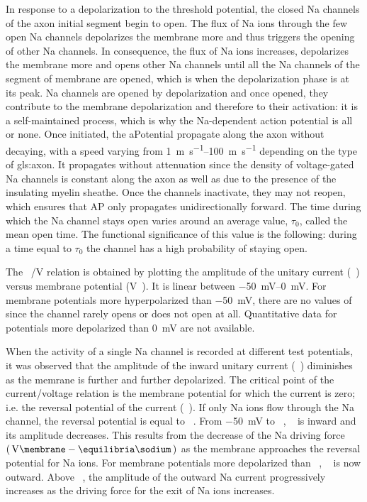 \documentclass[../../Orator]{subfiles}
\begin{document}
In response to a depolarization to the threshold potential, the closed \gls{Na} channels of the axon initial segment begin to open. The flux of \gls{Na} ions through the few open \gls{Na} channels depolarizes the membrane more and thus triggers the opening of other \gls{Na} channels. In consequence, the flux of \gls{Na} ions increases, depolarizes the membrane more and opens other \gls{Na} channels until all the \gls{Na} channels of the segment of membrane are opened, which is when the depolarization phase is at its peak. \gls{Na} channels are opened by depolarization and once opened, they contribute to the membrane depolarization and therefore to their activation: it is a self-maintained process, which is why the  \gls{Na}-dependent  action  potential  is  all  or  none. Once initiated, the \gls{aPotential} propagate along the axon without decaying, with a speed varying from \qtyrange{1}{100}{\m\per\s} depending on the type of \gls{gls:axon}.  It  propagates  without  attenuation  since  the  density of voltage-gated \gls{Na} channels is constant along the  axon as well as due to the presence of the insulating myelin sheathe.  Once the channels inactivate, they may not reopen, which ensures that AP only propagates  unidirectionally forward. 
The time during which the \gls{Na} channel stays open varies around an average value, \(\tau_0\), called the mean open time. The functional significance of this value is the following: during a time equal to \(\tau_0\) the channel has a high probability of staying open. 

The \unit[per-mode = symbol]{\cur\sodium\per\V} relation is obtained by plotting the amplitude of the unitary current (\unit{\cur\sodium}) versus membrane potential (\unit{\V\membrane}). It is linear between \qtyrange{-50}{0}{\mV}. For membrane potentials more hyperpolarized than \qty{-50}{\mV}, there are no values of \unit{\cur\sodium} since the channel rarely opens or does not open at all. Quantitative data for potentials more depolarized than \qty{0}{\mV} are not available.

When the activity of a single \gls{Na} channel is  recorded at different test potentials, it was observed that the amplitude of the inward unitary current (\unit{\cur\sodium}) diminishes as the memrane is further and further depolarized. The critical point of the current/voltage relation is the membrane potential for which the current is zero; i.e. the reversal potential of the current (\unit{\equilibria\reverse}). If only \gls{Na} ions flow through the \gls{Na} channel, the reversal potential is equal to \unit{\equilibria\sodium}. From \qty{-50}{\mV} to \unit{\equilibria\reverse}, \unit{\cur\sodium} is inward and its amplitude decreases. This results from the decrease of the \gls{Na} driving force \(\br{\unit{\V\membrane}-\unit{\equilibria\sodium}}\) as the membrane approaches the reversal potential for \gls{Na} ions. For membrane potentials more depolarized than \unit{\equilibria\reverse}, \unit{\cur\sodium} is now outward. Above \unit{\equilibria\reverse}, the amplitude of the outward \gls{Na} current progressively increases as the driving force for the exit of \gls{Na} ions increases. 
\end{document}
